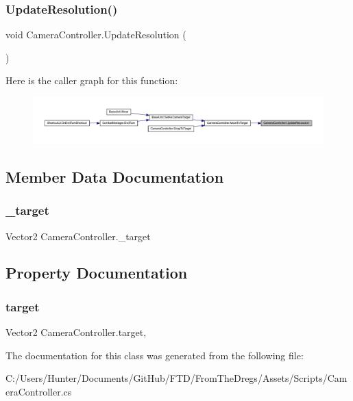 \subsubsection{\texorpdfstring{UpdateResolution()}{UpdateResolution()}}
{\footnotesize\ttfamily void Camera\+Controller.\+Update\+Resolution (\begin{DoxyParamCaption}{ }\end{DoxyParamCaption})}

Here is the caller graph for this function\+:
\nopagebreak
\begin{figure}[H]
\begin{center}
\leavevmode
\includegraphics[width=350pt]{class_camera_controller_a4894dc3111b871a8bf5ff422d30c1689_icgraph}
\end{center}
\end{figure}


\subsection{Member Data Documentation}
\mbox{\label{class_camera_controller_ac211a3ef97d78311cab3215e02dcaa8e}} 
\subsubsection{\texorpdfstring{\_target}{\_target}}
{\footnotesize\ttfamily Vector2 Camera\+Controller.\+\_\+target}



\subsection{Property Documentation}
\mbox{\label{class_camera_controller_a1557d6d0a4b70b6bb53f5a913329d0d0}} 
\subsubsection{\texorpdfstring{target}{target}}
{\footnotesize\ttfamily Vector2 Camera\+Controller.\+target\hspace{0.3cm}{\ttfamily [get]}, {\ttfamily [set]}}



The documentation for this class was generated from the following file\+:\begin{DoxyCompactItemize}
\item 
C\+:/\+Users/\+Hunter/\+Documents/\+Git\+Hub/\+F\+T\+D/\+From\+The\+Dregs/\+Assets/\+Scripts/Camera\+Controller.\+cs\end{DoxyCompactItemize}
